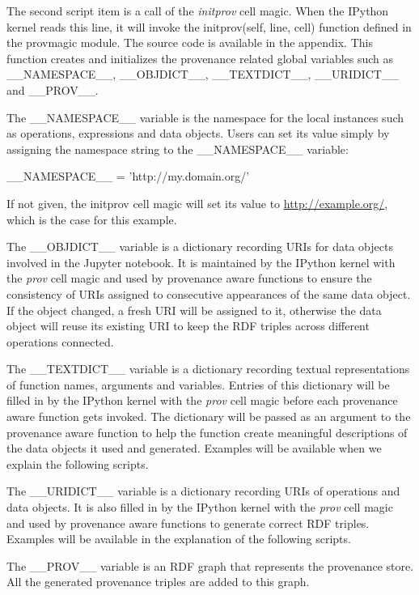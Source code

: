 The second script item is a call of the \emph{initprov} cell magic. When the IPython kernel reads this line, it will invoke the initprov(self, line, cell) function defined in the provmagic module. The source code is available in the appendix. This function creates and initializes the provenance related global variables such as \_\_NAMESPACE\_\_, \_\_OBJDICT\_\_, \_\_TEXTDICT\_\_, \_\_URIDICT\_\_ and \_\_PROV\_\_. 

The \_\_NAMESPACE\_\_ variable is the namespace for the local instances such as operations, expressions and data objects. Users can set its value simply by assigning the namespace string to the \_\_NAMESPACE\_\_ variable:

\_\_NAMESPACE\_\_ = 'http://my.domain.org/'

If not given, the initprov cell magic will set its value to \url{http://example.org/}, which is the case for this example.

The \_\_OBJDICT\_\_ variable is a dictionary recording URIs for data objects involved in the Jupyter notebook. It is maintained by the IPython kernel with the \emph{prov} cell magic and used by provenance aware functions to ensure the consistency of URIs assigned to consecutive appearances of the same data object. If the object changed, a fresh URI will be assigned to it, otherwise the data object will reuse its existing URI to keep the RDF triples across different operations connected.

The \_\_TEXTDICT\_\_ variable is a dictionary recording textual representations of function names, arguments and variables. Entries of this dictionary will be filled in by the IPython kernel with the \emph{prov} cell magic before each provenance aware function gets invoked. The dictionary will be passed as an argument to the provenance aware function to help the function create meaningful descriptions of the data objects it used and generated. Examples will be available when we explain the following scripts.

The \_\_URIDICT\_\_ variable is a dictionary recording URIs of operations and data objects. It is also filled in by the IPython kernel with the \emph{prov} cell magic and used by provenance aware functions to generate correct RDF triples. Examples will be available in the explanation of the following scripts.

The \_\_PROV\_\_ variable is an RDF graph that represents the provenance store. All the generated provenance triples are added to this graph.

